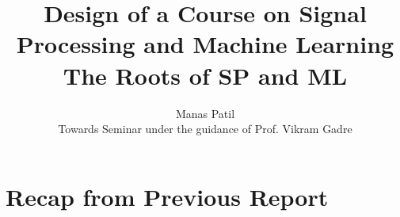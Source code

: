 \documentclass[12pt]{article}
\title{Design of a Course on Signal Processing and Machine Learning \\ The Roots of SP and ML}
\author{Manas Patil \\Towards Seminar under the guidance of Prof. Vikram Gadre}
\date{}
\begin{document}
\maketitle

\section{Recap from Previous Report}
\end{document}

